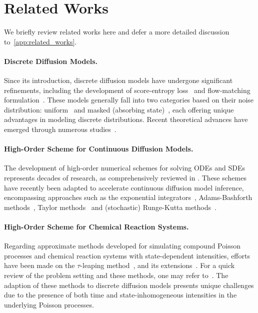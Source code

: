 \section{Related Works}
We briefly review related works here and defer a more detailed discussion to~\cref{app:related_works}.

\vspace{-0.7em}
\paragraph{Discrete Diffusion Models.}
Since its introduction, discrete diffusion models have undergone significant refinements, including the development of score-entropy loss~\citep{lou2024discrete} and flow-matching formulation~\citep{campbell2024generative,gat2024discrete}. These models generally fall into two categories based on their noise distribution: uniform~\citep{lou2024discrete,schiff2024simple} and masked (absorbing state)~\citep{ou2024your,shi2024simplified,sahoo2024simple,zheng2024masked}, each offering unique advantages in modeling discrete distributions. Recent theoretical advances have emerged through numerous studies~\citep{chen2024convergence, zhang2024convergence, ren2024discrete}.

\paragraph{High-Order Scheme for Continuous Diffusion Models.}

The development of high-order numerical schemes for solving ODEs and SDEs represents decades of research, as comprehensively reviewed in \citet{butcher1987numerical,kloeden1992numerical,kloeden2012numerical}. These schemes have recently been adapted to accelerate continuous diffusion model inference, encompassing approaches such as the exponential integrators~\citep{zhang2022fast,zhanggddim}, Adams-Bashforth methods~\citep{lu2022dpm++,xue2024sa,zhangsong2023improved}, Taylor methods~\citep{tachibana2021quasi,dockhorn2022genie} and (stochastic) Runge-Kutta methods~\citep{liu2022pseudo,lu2022dpm,karras2022elucidating, zheng2023dpm, li2024accelerating,wu2024stochastic}.


\paragraph{High-Order Scheme for Chemical Reaction Systems.}

Regarding approximate methods developed for simulating compound Poisson processes and chemical reaction systems with state-dependent intensities, efforts have been made on the $\tau$-leaping method~\citep{gillespie2001approximate}, and its extensions~\cite{cao2004numerical, burrage2004poisson, hu2011weaka, hu2009highly}. For a quick review of the problem setting and these methods, one may refer to~\citet{weinan2021applied}. The adaption of these methods to discrete diffusion models presents unique challenges due to the presence of both time and state-inhomogeneous intensities in the underlying Poisson processes.